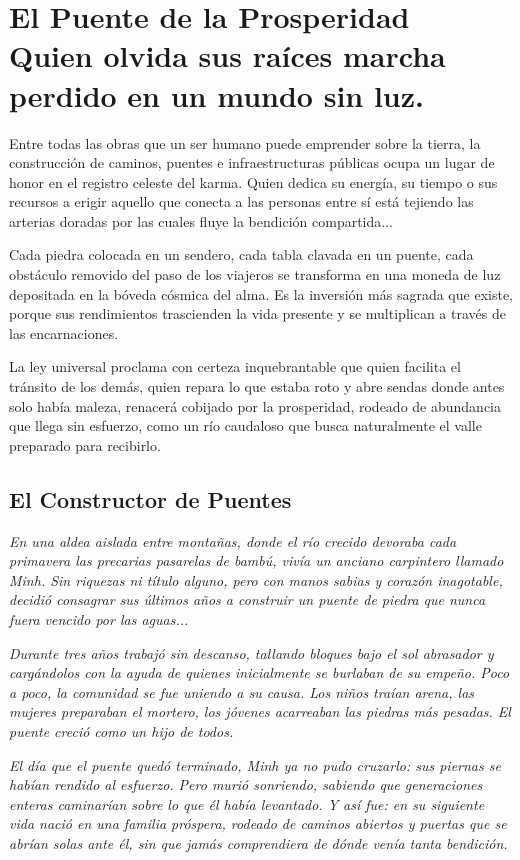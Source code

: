 \chapter[El Puente de la Prosperidad]{El Puente de la Prosperidad\\ \large Quien olvida sus raíces marcha perdido en un mundo sin luz.}


\lettrine[lines=3, nindent=0.5em, findent=0.2em]{E}{}ntre todas las obras que un ser humano puede emprender sobre la tierra, la construcción de caminos, puentes e infraestructuras públicas ocupa un lugar de honor en el registro celeste del karma. Quien dedica su energía, su tiempo o sus recursos a erigir aquello que conecta a las personas entre sí está tejiendo las arterias doradas por las cuales fluye la bendición compartida...

Cada piedra colocada en un sendero, cada tabla clavada en un puente, cada obstáculo removido del paso de los viajeros se transforma en una moneda de luz depositada en la bóveda cósmica del alma. Es la inversión más sagrada que existe, porque sus rendimientos trascienden la vida presente y se multiplican a través de las encarnaciones.

La ley universal proclama con certeza inquebrantable que quien facilita el tránsito de los demás, quien repara lo que estaba roto y abre sendas donde antes solo había maleza, renacerá cobijado por la prosperidad, rodeado de abundancia que llega sin esfuerzo, como un río caudaloso que busca naturalmente el valle preparado para recibirlo.

\section{El Constructor de Puentes}
\begin{elegantquote}
\textit{En una aldea aislada entre montañas, donde el río crecido devoraba cada primavera las precarias pasarelas de bambú, vivía un anciano carpintero llamado Minh. Sin riquezas ni título alguno, pero con manos sabias y corazón inagotable, decidió consagrar sus últimos años a construir un puente de piedra que nunca fuera vencido por las aguas...}

\textit{Durante tres años trabajó sin descanso, tallando bloques bajo el sol abrasador y cargándolos con la ayuda de quienes inicialmente se burlaban de su empeño. Poco a poco, la comunidad se fue uniendo a su causa. Los niños traían arena, las mujeres preparaban el mortero, los jóvenes acarreaban las piedras más pesadas. El puente creció como un hijo de todos.}

\textit{El día que el puente quedó terminado, Minh ya no pudo cruzarlo: sus piernas se habían rendido al esfuerzo. Pero murió sonriendo, sabiendo que generaciones enteras caminarían sobre lo que él había levantado. Y así fue: en su siguiente vida nació en una familia próspera, rodeado de caminos abiertos y puertas que se abrían solas ante él, sin que jamás comprendiera de dónde venía tanta bendición.}

\end{elegantquote}

